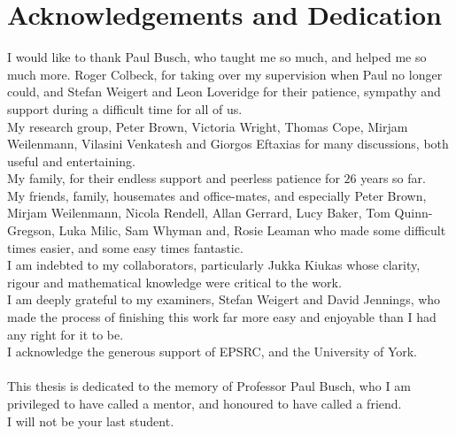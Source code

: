 
\chapter*{Acknowledgements and Dedication}
\setcounter{page}{11}

I would like to thank Paul Busch, who taught me so much, and helped me so much more. Roger Colbeck, for taking over my supervision when Paul no longer could, and Stefan Weigert and Leon Loveridge for their patience, sympathy and support during a difficult time for all of us.\\
My research group, Peter Brown, Victoria Wright, Thomas Cope, Mirjam Weilenmann, Vilasini Venkatesh and Giorgos Eftaxias for many discussions, both useful and entertaining.\\
My family, for their endless support and peerless patience for $26$ years so far.\\
My friends, family, housemates and office-mates, and especially Peter Brown, Mirjam Weilenmann, Nicola Rendell, Allan Gerrard, Lucy Baker, Tom Quinn-Gregson, Luka Milic, Sam Whyman and, Rosie Leaman who made some difficult times easier, and some easy times fantastic.\\
I am indebted to my collaborators, particularly Jukka Kiukas whose clarity, rigour and mathematical knowledge were critical to the work.\\
I am deeply grateful to my examiners, Stefan Weigert and David Jennings, who made the process of finishing this work far more easy and enjoyable than I had any right for it to be.\\
I acknowledge the generous support of EPSRC, and the University of York.\\ \\
This thesis is dedicated to the memory of Professor Paul Busch, who I am privileged to have called a mentor, and honoured to have called a friend. \\I will not be your last student.



\clearpage 